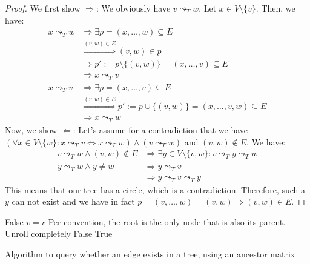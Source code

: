 \begin{proof}
    We first show $\Rightarrow$: We obviously have $v \leadsto_T w$. Let $x \in V \setminus \{v\}$. Then, we have:
    \begin{align*}
        x \leadsto_T w  &\Rightarrow \exists p = (x, \dots, w) \subseteq E \\
                        &\stackrel{(v, w) \in E}{\Rightarrow} (v, w) \in p \\
                        &\Rightarrow p' := p \setminus \{(v, w)\} = (x, \dots, v) \subseteq E \\
                        &\Rightarrow x \leadsto_T v \\
        x \leadsto_T v  &\Rightarrow \exists p = (x, \dots, v) \subseteq E \\
                        &\stackrel{(v, w) \in E}{\Rightarrow} p' := p \cup \{(v, w)\} = (x, \dots, v, w) \subseteq E \\
                        &\Rightarrow x \leadsto_T w
    \end{align*}
    Now, we show $\Leftarrow$: Let's assume for a contradiction that we have $(\forall x \in V \setminus \{w\}: x \leadsto_T v \Leftrightarrow x \leadsto_T w) \wedge (v \leadsto_T w)$ and $(v, w) \notin E$. We have:
    \begin{align*}
        v \leadsto_T w \wedge (v, w) \notin E &\Rightarrow \exists y \in V \setminus \{v, w\}: v \leadsto_T y \leadsto_T w \\
        y \leadsto_T w \wedge y \neq w &\Rightarrow y \leadsto_T v \\
        &\Rightarrow y \leadsto_T v \leadsto_T y
    \end{align*}
    This means that our tree has a circle, which is a contradiction. Therefore, such a $y$ can not exist and we have in fact $p = (v, \dots, w) = (v, w) \Rightarrow (v, w) \in E$.
\end{proof}

\begin{algorithm}[p]
    \begin{algorithmic}[1]
                \State \Return False
            \EndIf
                \State \Return $v = r$ \Comment Per convention, the root is the only node that is also its parent.
            \EndIf
             \Comment Unroll completely
                    \State \Return False
                \EndIf
            \EndFor
            \State \Return True
        \EndFunction
    \end{algorithmic}
    \caption{Algorithm to query whether an edge exists in a tree, using an ancestor matrix}
    \label{alg:is_parent}
\end{algorithm}

